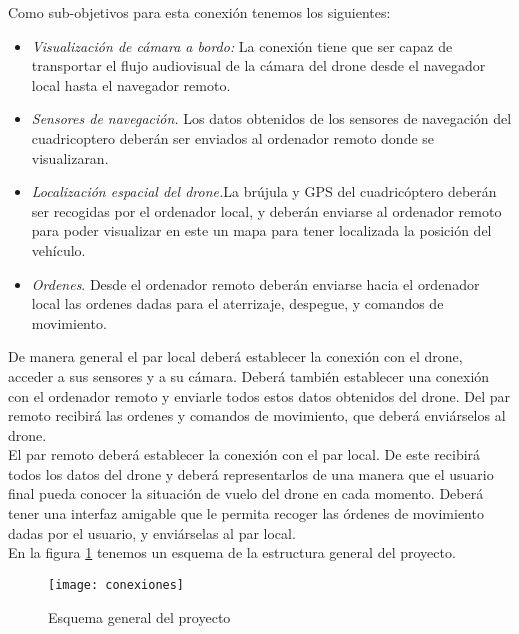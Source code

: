 Como sub-objetivos para esta conexión tenemos los siguientes:

\begin{itemize}

\item \emph{Visualización de cámara a bordo:} La conexión tiene que ser capaz de transportar el flujo audiovisual de la cámara del drone desde el navegador local hasta el navegador remoto.

\item \emph{Sensores de navegación.} Los datos obtenidos de los sensores de navegación del cuadricoptero deberán ser enviados al ordenador remoto donde se visualizaran.

\item \emph{Localización espacial del drone.}La brújula y GPS del cuadricóptero deberán ser recogidas por el ordenador local, y deberán enviarse al ordenador remoto para poder visualizar en este un mapa para tener localizada la posición del vehículo.

\item \emph{Ordenes}. Desde el ordenador remoto deberán enviarse hacia el ordenador local las ordenes dadas para el aterrizaje, despegue, y comandos de movimiento.


\end{itemize}

De manera general el par local deberá establecer la conexión con el drone, acceder a sus sensores y a su cámara. Deberá también establecer una conexión con el ordenador remoto y enviarle todos estos datos obtenidos del drone. Del par remoto recibirá las ordenes y comandos de movimiento, que deberá enviárselos al drone.\\

El par remoto deberá establecer la conexión con el par local. De este recibirá todos los datos del drone y deberá representarlos de una manera que el usuario final pueda conocer la situación de vuelo del drone en cada momento. Deberá tener una interfaz amigable que le permita recoger las órdenes de movimiento dadas por el usuario, y enviárselas al par local.\\

En la figura \ref{fig:esquemageneral} tenemos un esquema de la estructura general del proyecto.\\

\begin{figure}[htb]
\centering
\texttt{[image: conexiones]}
\caption{Esquema general del proyecto}
\label{fig:esquemageneral}
\end{figure}

